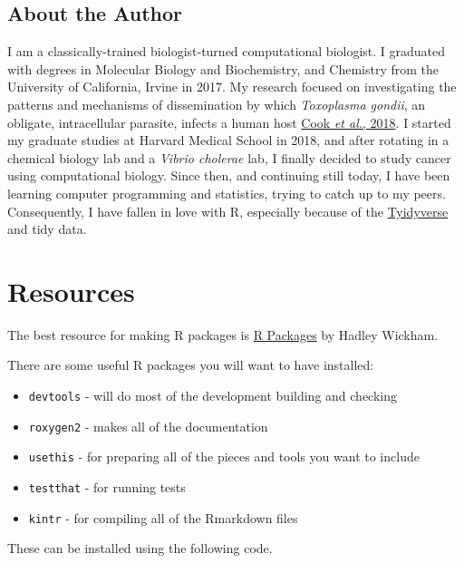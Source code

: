 \documentclass[]{book}
\providecommand{\tightlist}{%
  \setlength{\itemsep}{0pt}\setlength{\parskip}{0pt}}
\begin{document}
\subsection*{About the Author}\label{about-the-author}

I am a classically-trained biologist-turned computational biologist. I
graduated with degrees in Molecular Biology and Biochemistry, and
Chemistry from the University of California, Irvine in 2017. My research
focused on investigating the patterns and mechanisms of dissemination by
which \emph{Toxoplasma gondii}, an obligate, intracellular parasite,
infects a human host
\href{https://www.ncbi.nlm.nih.gov/pubmed/29295815}{Cook \emph{et al.},
2018}. I started my graduate studies at Harvard Medical School in 2018,
and after rotating in a chemical biology lab and a \emph{Vibrio
cholerae} lab, I finally decided to study cancer using computational
biology. Since then, and continuing still today, I have been learning
computer programming and statistics, trying to catch up to my peers.
Consequently, I have fallen in love with R, especially because of the
\href{https://www.tidyverse.org}{Tyidyverse} and tidy data.

\section*{Resources}\label{resources}

The best resource for making R packages is
\href{https://r-pkgs.org/index.html}{R Packages} by Hadley Wickham.

There are some useful R packages you will want to have installed:

\begin{itemize}
\tightlist
\item
  \texttt{devtools} - will do most of the development building and
  checking
\item
  \texttt{roxygen2} - makes all of the documentation
\item
  \texttt{usethis} - for preparing all of the pieces and tools you want
  to include
\item
  \texttt{testthat} - for running tests
\item
  \texttt{kintr} - for compiling all of the Rmarkdown files
\end{itemize}

These can be installed using the following code.
\end{document}
